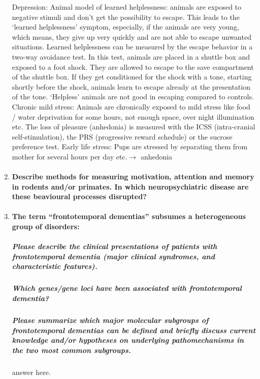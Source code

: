 \documentclass[12pt,article,oneside,a4paper]{memoir}
\begin{document}
\begin{enumerate}
	Depression:
	Animal model of learned helplessness: animals are exposed to negative stimuli and don’t get the possibility to escape. This leads to the ‘learned helplessness’ symptom, especially, if the animals are very young, which means, they give up very quickly and are not able to escape unwanted situations. Learned helplessness can be measured by the escape behavior in a two-way avoidance test. In this test, animals are placed in a shuttle box and exposed to a foot shock. They are allowed to escape to the save compartment of the shuttle box. If they get conditioned for the shock with a tone, starting shortly before the shock, animals learn to escape already at the presentation of the tone. ‘Helpless’ animals are not good in escaping compared to controls.
	Chronic mild stress: Animals are chronically exposed to mild stress like food / water deprivation for some hours, not enough space, over night illumination etc. The loss of pleasure (anhedonia) is measured with the ICSS (intra-cranial self-stimulation), the PRS (progressive reward schedule) or the sucrose preference test.
	Early life stress: Pups are stressed by separating them from mother for several hours per day etc.$\rightarrow$ anhedonia

\item \paragraph{Describe methods for measuring motivation, attention and memory in rodents and/or primates. In which neuropsychiatric disease are these beavioural processes disrupted?}

\item \paragraph{The term ``frontotemporal dementias'' subsumes a heterogeneous group of disorders:}
\subparagraph{Please describe the clinical presentations of patients with frontotemporal dementia (major clinical syndromes, and characteristic features).} \subparagraph{Which genes/gene loci have been associated with frontotemporal dementia?} \subparagraph{Please summarize which major molecular subgroups of frontotemporal dementias can be defined and briefly discuss current knowledge and/or hypotheses on underlying pathomechanisms in the two most common subgroups.} answer here.

\end{enumerate}
\end{document}

